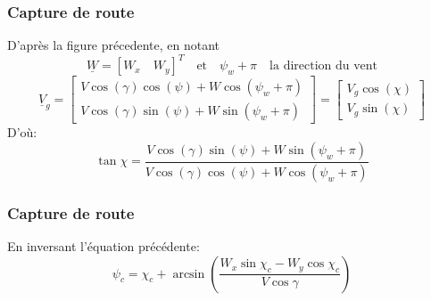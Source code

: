 \documentclass[tikz, footheight=2em]{beamer}
\begin{document}
\begin{frame}
    \frametitle{Capture de route} \pause{}
    D'après la figure précedente, en notant
    \[ \underline{W} = {[W_x \quad W_y]}^T \quad \text{et}\quad \psi_w +
    \pi \quad \text{la direction du vent}\] \pause{}
    \[
    \underline{V}_g
    =
    \left[
    \begin{array}{c}
        V \cos (\gamma) \cos (\psi) + W \cos (\psi_w + \pi) \\
        V \cos (\gamma) \sin (\psi) + W \sin (\psi_w + \pi)
    \end{array}
    \right]
    =
    \left[
    \begin{array}{c}
        V_{g} \cos (\chi) \\
        V_{g} \sin (\chi)
    \end{array}
    \right]
    \] \pause{}
    D'où:
    \[
    \tan \chi = \frac
    {V \cos (\gamma) \sin (\psi) + W \sin (\psi_w + \pi)}
    {V \cos (\gamma) \cos (\psi) + W \cos (\psi_w + \pi)}
    \]
\end{frame}

\begin{frame}
    \frametitle{Capture de route} \pause{}
    En inversant l'équation précédente:
    \[
    \boxed{
    \psi_c=
    \chi_c + \arcsin
    \left(
    \frac
    {W_x \sin \chi_c - W_y \cos \chi_c}
    {V \cos \gamma}
    \right)
    }
    \]
\end{frame}
\end{document}
